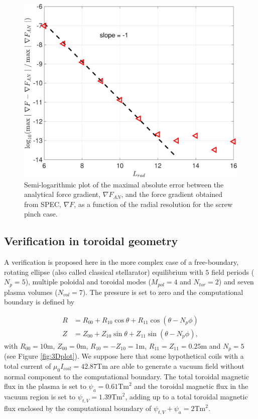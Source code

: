  \begin{figure}
     \centering
     \includegraphics[width=0.5\linewidth]{main/Figures_CurrentConstraint/ABaillod_fig7.pdf}
     \caption{Semi-logarithmic plot of the maximal absolute error between the analytical force gradient, $\nabla F_{AN}$, and the force gradient obtained from \ac{SPEC}, $\nabla F$, as a function of the radial resolution for the screw pinch case.}
     \label{fig:ForceGradient_Convergence_ScrewPinch}
 \end{figure}
 
 \subsection{Verification in toroidal geometry}
 
 A verification is proposed here in the more complex case of a free-boundary, rotating ellipse (also called classical stellarator) equilibrium with $5$ field periods ($N_p=5$), multiple poloidal and toroidal modes ($M_{pol}=4$ and $N_{tor}=2$) and seven plasma volumes ($N_{vol}=7$). The pressure is set to zero and the computational boundary is defined by
 
 \begin{align}
     R &= R_{00} + R_{10} \cos\theta + R_{11}\cos(\theta - N_p\phi)\label{eq.RotEllipse_R}\\
     Z &= Z_{00} + Z_{10} \sin\theta + Z_{11}\sin(\theta - N_p\phi),\label{eq.RotEllipse_Z}
 \end{align}
 with $R_{00}=10$m, $Z_{00}=0$m, $R_{10}=-Z_{10}=1$m, $R_{11}=Z_{11}=0.25$m and $N_p = 5$ (see Figure \ref{fig:3Dplot}). We suppose here that some hypothetical coils with a total current of $\mu_0I_{coil}=42.87$Tm are able to generate a vacuum field without normal component to the computational boundary. The total toroidal magnetic flux in the plasma is set to $\psi_a=0.61\text{Tm}^2$ and the toroidal magnetic flux in the vacuum region is set to $\psi_{t,V}=1.39\text{Tm}^2$, adding up to a total toroidal magnetic flux enclosed by the computational boundary of $\psi_{t,V} + \psi_a = 2\text{Tm}^2$.
 
